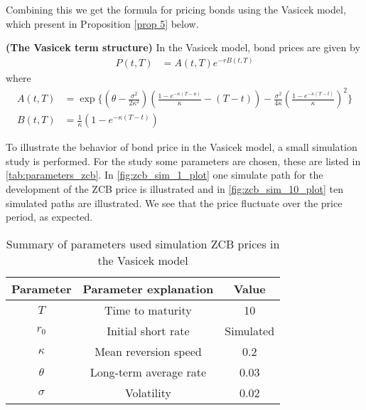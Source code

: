 \\\\
 Combining this we get the formula for pricing bonds using the Vasicek model, which present 
 in Proposition \autoref{prop 5} below. 
\newpage
\begin{proposition}
    \label{prop 5}
    \textbf{(The Vasicek term structure)} In the Vasicek model, bond prices are given by
 \begin{align}
    P(t,T) &= A(t,T) e^{-rB(t,T)} 
\end{align}
where
\begin{align*}
    A(t,T)&= \exp \Biggl\{\left(\theta-\frac{\sigma^2}{2 \kappa^2}\right)\left(\frac{1-e^{-\kappa(T-u)}}{\kappa}-(T-t)\right)
    -\frac{\sigma^2}{4 \kappa}\left(\frac{1-e^{-\kappa(T-t)}}{\kappa}\right)^2 \Biggr\} \\
    B(t,T) & =\frac{1}{\kappa} \left( 1 - e^{-\kappa (T-t)} \right)  
\end{align*}
\cite{Bjork}

\end{proposition}
\noindent
To illustrate the behavior of bond price in the Vasicek model, a small simulation study is performed. For the study 
some parameters are chosen, these are listed in \autoref{tab:parameters_zcb}. In \autoref{fig:zcb_sim_1_plot} one simulate
path for the development of the ZCB price is illustrated and in \autoref{fig:zcb_sim_10_plot} ten simulated paths are illustrated.
We see that the price fluctuate over the price period, as expected.
\\
\begin{table}[H]
    \centering
    \begin{tabular}{ccc}
      \toprule
      \textbf{Parameter} & \textbf{Parameter explanation} & \textbf{Value} \\
      \midrule
      \rowcolor{lightgray!40} $T$ & Time to maturity & 10 \\
      $r_0$ & Initial short rate & Simulated \\
      \rowcolor{lightgray!40} $\kappa$ & Mean reversion speed & 0.2\\
      $\theta$ & Long-term average rate  & 0.03 \\
      \rowcolor{lightgray!40} $\sigma$ & Volatility& 0.02 \\
      \bottomrule
    \end{tabular}
    \caption{Summary of parameters used simulation ZCB prices in the Vasicek model}
    \label{tab:parameters_zcb}
\end{table}
